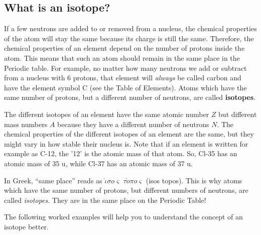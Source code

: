 \subsection{What is an isotope?}

If a few neutrons are added to or removed from a nucleus, the chemical properties of the atom will stay the same because its charge is still the same. Therefore, the chemical properties of an element depend on the number of protons inside the atom. This means that such an atom should remain in the same place in the Periodic table. For example, no matter how many neutrons we add or subtract from a nucleus with 6 protons, that element will \emph{always} be called carbon and have the
element symbol C (see the Table of Elements). Atoms which have the same number of protons, but a different number of neutrons, are called \textbf{isotopes}. 


The different isotopes of an element have the same atomic
number $Z$ but different mass numbers $A$ because they have a different
number of neutrons $N$. The chemical properties of the different
isotopes of an element are the same, but they might vary in how stable their nucleus is. Note that if an element is written for example as C-12, the '12' is the atomic mass of that atom. So, Cl-35 has an atomic mass of 35 u, while Cl-37 has an atomic mass of 37 u.

\begin{IFact}{In Greek, ``same place'' reads as
$\grave{\iota}\sigma o\varsigma$ $\tau \grave{o}\pi o\varsigma$
(isos topos). This is why atoms which have the same number of protons, but
different numbers of neutrons, are called {\it isotopes}. They are in the same place on the Periodic Table!}\end{IFact}

The following worked examples will help you to understand the concept of an isotope better.

